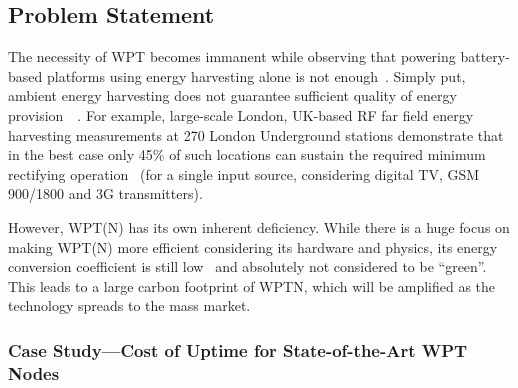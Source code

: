 \documentclass[11pt,draftclsnofoot,journal,onecolumn]{IEEEtran}
\begin{document}
\subsection{Problem Statement}
\label{sec:problem_statement}

The necessity of WPT becomes immanent while observing that powering battery-based platforms using energy harvesting alone is not enough~\cite[Section I]{Pinuela_mtt_2013}. Simply put, ambient energy harvesting does not guarantee sufficient quality of energy provision~\cite[Sec. 3.3]{dai_tpds_2014}~\cite[Section I]{timotheou_twc_2014}. For example, large-scale London, UK-based RF far field energy harvesting measurements at 270 London Underground stations demonstrate that in the best case only 45\% of such locations can sustain the required minimum rectifying operation~\cite[Table VI]{Pinuela_mtt_2013} (for a single input source, considering digital TV, GSM 900/1800 and 3G transmitters).

However, WPT(N) has its own inherent deficiency. While there is a huge focus on making WPT(N) more efficient considering its hardware and physics, its energy conversion coefficient is still low~\cite[Section I]{Pinuela_mtt_2013} and absolutely not considered to be ``green''. This leads to a large carbon footprint of WPTN, which will be amplified as the technology spreads to the mass market. 

\subsubsection{Case Study---Cost of Uptime for State-of-the-Art WPT Nodes}
\label{sec:case_study_measurement}
\end{document}
